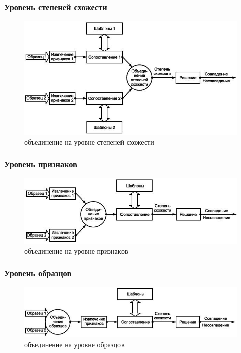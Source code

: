 \documentclass{beamer}
\begin{document}
\begin{frame}
\frametitle{Уровень степеней схожести}

\begin{figure}[h!]
\centering
\includegraphics[scale=0.50]{res/bio_b}
\caption{объединение на уровне степеней схожести}
\end{figure}

\end{frame}

\begin{frame}
\frametitle{Уровень признаков}

\begin{figure}[h!]
\centering
\includegraphics[scale=0.50]{res/bio_c}
\caption{объединение на уровне признаков}
\end{figure}

\end{frame}

\begin{frame}
\frametitle{Уровень образцов}

\begin{figure}[h!]
\centering
\includegraphics[scale=0.50]{res/bio_d}
\caption{объединение на уровне образцов}
\end{figure}

\end{frame}
\end{document}
